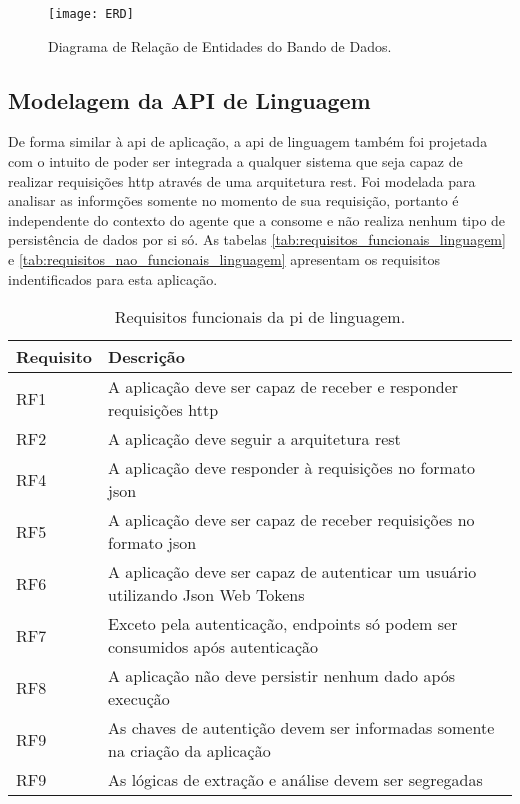\begin{figure}[H]
  \captionsetup{width=0.43\textwidth}
  \caption{Diagrama de Relação de Entidades do Bando de Dados.}
  \label{fig:ERD}
  \texttt{[image: ERD]}
  \fonte{}
\end{figure}

\subsection{Modelagem da API de Linguagem}\label{subsec:modelagem_linguagem}

De forma similar à \gls{api} de aplicação, a \gls{api} de linguagem também foi projetada com o intuito de poder ser integrada a qualquer sistema que seja capaz de realizar requisições \gls{http} através de uma arquitetura \gls{rest}. Foi modelada para analisar as informções somente no momento de sua requisição, portanto é independente do contexto do agente que a consome e não realiza nenhum tipo de persistência de dados por si só. As tabelas \autoref{tab:requisitos_funcionais_linguagem} e \autoref{tab:requisitos_nao_funcionais_linguagem} apresentam os requisitos indentificados para esta aplicação.

\begin{table}[H]
  \caption{Requisitos funcionais da pi de linguagem.}
  \label{tab:requisitos_funcionais_linguagem}
  \begin{tabularx}{\textwidth}{l|l}
    \hline
    \textbf{Requisito} & \textbf{Descrição}                                                             \\ \hline
    RF1                & A aplicação deve ser capaz de receber e responder requisições \gls{http}       \\
    RF2                & A aplicação deve seguir a arquitetura \gls{rest}                               \\
    RF4                & A aplicação deve responder à requisições no formato \gls{json}                 \\
    RF5                & A aplicação deve ser capaz de receber requisições no formato \gls{json}        \\
    RF6                & A aplicação deve ser capaz de autenticar um usuário utilizando Json Web Tokens \\
    RF7                & Exceto pela autenticação, endpoints só podem ser consumidos após autenticação  \\
    RF8                & A aplicação não deve persistir nenhum dado após execução                       \\
    RF9                & As chaves de autentição devem ser informadas somente na criação da aplicação   \\
    RF9                & As lógicas de extração e análise devem ser segregadas                          \\ \hline
  \end{tabularx}
  \fonte{}
\end{table}

